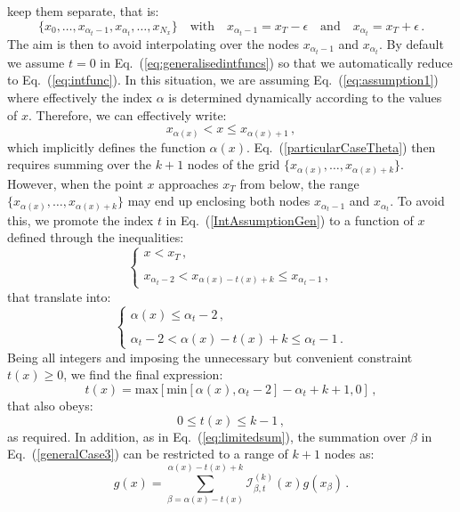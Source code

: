 \documentclass[10pt,a4paper]{article}
\begin{document}
keep them separate, that is:
\begin{equation}
\{x_0,\dots,x_{\alpha_t-1},x_{\alpha_t},\dots,x_{N_x}\}\quad\mbox{with}\quad x_{\alpha_t-1}=x_T-\epsilon\quad\mbox{and}\quad x_{\alpha_t}=x_T+\epsilon\,.
\end{equation}
The aim is then to avoid interpolating over the nodes $x_{\alpha_t-1}$
and $x_{\alpha_t}$. By default we assume $t=0$ in
Eq.~(\ref{eq:generalisedintfuncs}) so that we automatically reduce to
Eq.~(\ref{eq:intfunc}). In this situation, we are assuming
Eq.~(\ref{eq:assumption1}) where effectively the index $\alpha$ is
determined dynamically according to the values of $x$. Therefore, we
can effectively write:
\begin{equation}
x_{\alpha(x)} < x \leq x_{\alpha(x)+1}\,,
\end{equation}
which implicitly defines the function
$\alpha(x)$. Eq.~(\ref{particularCaseTheta}) then requires summing
over the $k+1$ nodes of the grid
$\{x_{\alpha(x)},\dots,x_{\alpha(x)+k}\}$. However, when the point $x$
approaches $x_T$ from below, the range
$\{x_{\alpha(x)},\dots,x_{\alpha(x)+k}\}$ may end up enclosing both
nodes $x_{\alpha_t-1}$ and $x_{\alpha_t}$. To avoid this, we promote
the index $t$ in Eq.~(\ref{IntAssumptionGen}) to a function of $x$
defined through the inequalities:
\begin{equation}
\left\{\begin{array}{l}
x< x_T\,,\\
\\
x_{\alpha_t-2} < x_{\alpha(x)-t(x)+k}\leq x_{\alpha_t-1}\,,
\end{array}\right.
\end{equation}
that translate into:
\begin{equation}
\left\{\begin{array}{l}
\alpha(x) \leq \alpha_t -2\,,\\
\\
\alpha_t-2 <  \alpha(x)-t(x)+k \leq \alpha_t-1\,.
\end{array}\right.
\end{equation}
Being all integers and imposing the unnecessary but convenient
constraint $t(x)\geq 0$, we find the final expression:
\begin{equation}\label{eq:tdef}
t(x) = \mbox{max}\left[\mbox{min}\left[\alpha(x),\alpha_t -2\right] -\alpha_t+k + 1, 0\right] \,,
\end{equation}
that also obeys:
\begin{equation}
0\leq t(x) \leq k - 1\,,
\end{equation}
as required. In addition, as in Eq.~(\ref{eq:limitedsum}), the
summation over $\beta$ in Eq.~(\ref{generalCase3}) can be restricted
to a range of $k+1$ nodes as:
\begin{equation}\label{generalCase4}
g(x) =
\sum_{\beta=\alpha(x)-t(x)}^{\alpha(x)-t(x)+k}\mathcal{I}_{\beta,t}^{(k)}(x) g(x_{\beta})\,.
\end{equation}
\end{document}
